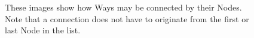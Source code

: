 \begin{figure}
	\centering

	\caption[Connections between Ways]{These images show how Ways may be connected by their Nodes. Note that a connection does not have to originate from the first or last Node in the list.}
	\label{fig:connectionsWays}
\end{figure}

